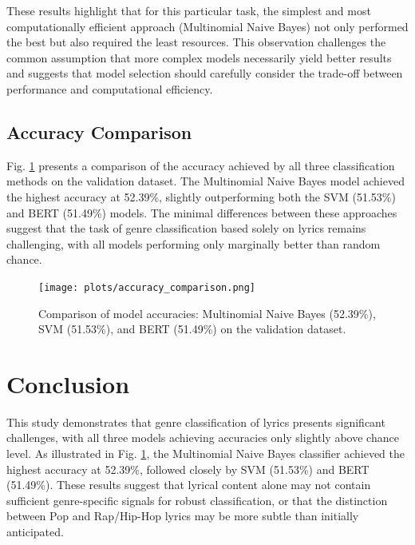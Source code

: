 \documentclass[conference]{IEEEtran}
\begin{document}
These results highlight that for this particular task, the simplest and most computationally efficient approach (Multinomial Naive Bayes) not only performed the best but also required the least resources. This observation challenges the common assumption that more complex models necessarily yield better results and suggests that model selection should carefully consider the trade-off between performance and computational efficiency.

\subsection{Accuracy Comparison}
Fig. \ref{fig:accuracy_comparison} presents a comparison of the accuracy achieved by all three classification methods on the validation dataset. The Multinomial Naive Bayes model achieved the highest accuracy at 52.39\%, slightly outperforming both the SVM (51.53\%) and BERT (51.49\%) models. The minimal differences between these approaches suggest that the task of genre classification based solely on lyrics remains challenging, with all models performing only marginally better than random chance.

\begin{figure}[htbp]
\centerline{\texttt{[image: plots/accuracy\_comparison.png]}}
\caption{Comparison of model accuracies: Multinomial Naive Bayes (52.39\%), SVM (51.53\%), and BERT (51.49\%) on the validation dataset.}
\label{fig:accuracy_comparison}
\end{figure}

\section{Conclusion}
This study demonstrates that genre classification of lyrics presents significant challenges, with all three models achieving accuracies only slightly above chance level. As illustrated in Fig. \ref{fig:accuracy_comparison}, the Multinomial Naive Bayes classifier achieved the highest accuracy at 52.39\%, followed closely by SVM (51.53\%) and BERT (51.49\%). These results suggest that lyrical content alone may not contain sufficient genre-specific signals for robust classification, or that the distinction between Pop and Rap/Hip-Hop lyrics may be more subtle than initially anticipated.
\end{document}
